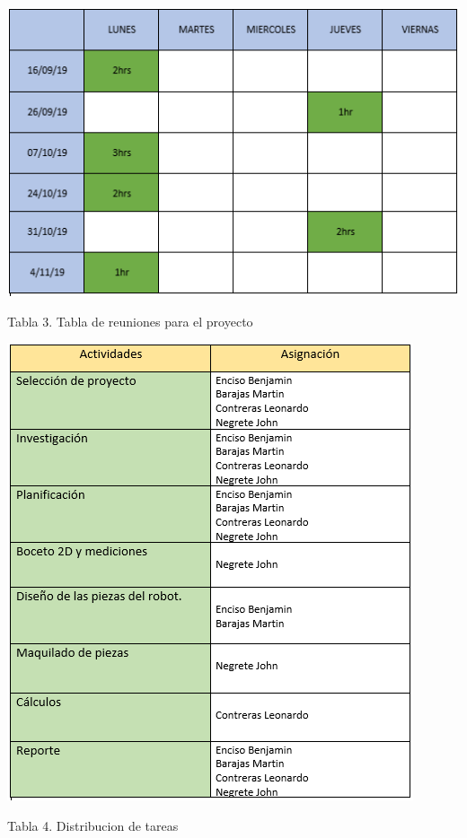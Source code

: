 \documentclass[12pt,letterpaper]{article}
\begin{document}
\newpage
\begin{center}
\includegraphics[scale=0.9]{Captura.PNG}
\end{center}
\begin{center}
Tabla 3. Tabla de reuniones para el proyecto
\end{center}
\begin{center}
\includegraphics[scale=1]{tablaa4.PNG}
\end{center}
\begin{center}
Tabla 4. Distribucion de tareas
\end{center}
\end{document}
